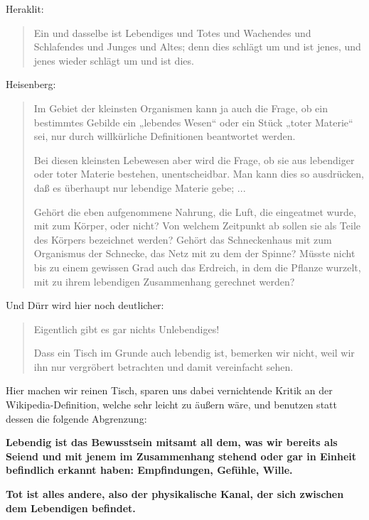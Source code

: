 \documentclass[12pt]{book}
\begin{document}
Heraklit:
\begin{quote}\begin{tcolorbox}
Ein und dasselbe ist Lebendiges und Totes und Wachendes und Schlafendes und Junges und Altes; denn dies schlägt um und ist jenes, und jenes wieder schlägt um und ist dies.
\end{tcolorbox}\end{quote}
Heisenberg:
\begin{quote}\begin{tcolorbox}
Im Gebiet der kleinsten Organismen kann ja auch die Frage, ob ein bestimmtes Gebilde ein „lebendes Wesen“ oder ein Stück „toter Materie“ sei, nur durch willkürliche Definitionen beantwortet werden.

Bei diesen kleinsten Lebewesen aber wird die Frage, ob sie aus lebendiger oder toter Materie bestehen, unentscheidbar. Man kann dies so ausdrücken, daß es überhaupt nur lebendige Materie gebe; ...

Gehört die eben aufgenommene Nahrung, die Luft, die eingeatmet wurde, mit zum Körper, oder nicht? Von welchem Zeitpunkt ab sollen sie als Teile des Körpers bezeichnet werden? Gehört das Schneckenhaus mit zum Organismus der Schnecke, das Netz mit zu dem der Spinne? Müsste nicht bis zu einem gewissen Grad auch das Erdreich, in dem die Pflanze wurzelt, mit zu ihrem lebendigen Zusammenhang gerechnet werden?
\end{tcolorbox}\end{quote}

Und Dürr wird hier noch deutlicher:
\begin{quote}\begin{tcolorbox}
Eigentlich gibt es gar nichts Unlebendiges!

Dass ein Tisch im Grunde auch lebendig ist, bemerken wir nicht, weil wir ihn nur vergröbert betrachten und damit vereinfacht sehen.
\end{tcolorbox}\end{quote}

Hier machen wir reinen Tisch, sparen uns dabei vernichtende Kritik an der Wikipedia-Definition, welche sehr leicht zu äußern wäre, und benutzen statt dessen die folgende Abgrenzung:

\textbf{Lebendig ist das Bewusstsein mitsamt all dem, was wir bereits als Seiend und mit jenem im Zusammenhang stehend oder gar in Einheit befindlich erkannt haben: Empfindungen, Gefühle, Wille.} 

\textbf{Tot ist alles andere, also der physikalische Kanal, der sich zwischen dem Lebendigen befindet.}
\end{document}

